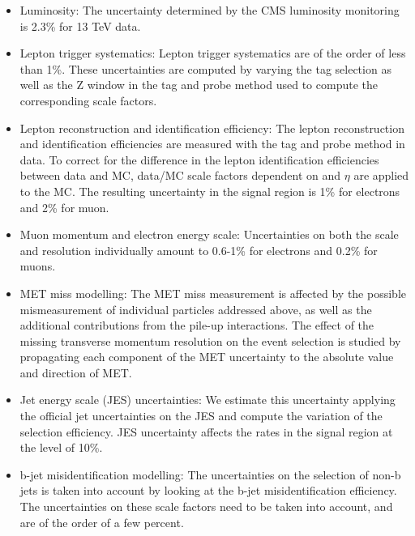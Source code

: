 \begin{itemize}
\item Luminosity: The uncertainty determined by the CMS luminosity monitoring is 2.3\% for 13 TeV data.
\item Lepton trigger systematics: Lepton trigger systematics are of the order of less than 1\%. 
These uncertainties are computed by varying the tag selection
as well as the Z window in the tag and probe method used to compute the corresponding scale factors.
\item Lepton reconstruction and identification efficiency:
The lepton reconstruction and identification efficiencies are measured with the tag
and probe method in data. To correct for the difference in the lepton identification
efficiencies between data and MC, data/MC scale factors dependent on \pt and $\eta$ are
applied to the MC. The resulting uncertainty in the signal region is  1\% for electrons
and 2\% for muon.
\item Muon momentum and electron energy scale:  Uncertainties on both the scale and resolution individually amount to  0.6-1\% for electrons 
and  0.2\% for muons. 

\item MET miss modelling: The MET miss measurement is affected by the possible mismeasurement of individual particles addressed above, 
as well as the additional contributions from the pile-up interactions. The effect of the missing transverse momentum resolution on the event selection is studied by propagating each component of the MET uncertainty to the absolute value and direction of MET.

\item Jet energy scale (JES) uncertainties: We estimate this uncertainty
applying the official jet uncertainties on the JES  and compute the variation of the selection efficiency. JES uncertainty affects the
rates in the signal region at the level of  10\%.

\item b-jet misidentification modelling: The uncertainties on the selection of non-b jets is taken into account by looking at
the b-jet misidentification efficiency. The uncertainties on these scale factors need to be taken into account, and are of the
order of a few percent.
\end{itemize}





